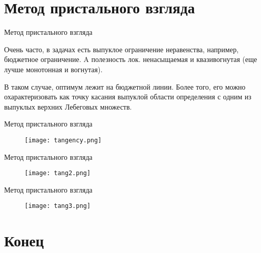 \documentclass{beamer}
\begin{document}
\section{Метод пристального взгляда}

\begin{frame}{Метод пристального взгляда}

Очень часто, в задачах есть выпуклое ограничение неравенства, например, бюджетное ограничение. A полезность лок. ненасыщаемая и квазивогнутая (еще лучше монотонная и вогнутая).

В таком случае, оптимум лежит на бюджетной линии. Более того, его можно охарактеризовать как точку касания выпуклой области определения с одним из выпуклых верхних Лебеговых множеств.
\end{frame}

\begin{frame}{Метод пристального взгляда}

\begin{figure}[hbt]
\centering
\texttt{[image: tangency.png]}
\end{figure}

\end{frame}
\begin{frame}{Метод пристального взгляда}

\begin{figure}[hbt]
\centering
\texttt{[image: tang2.png]}
\end{figure}

\end{frame}
\begin{frame}{Метод пристального взгляда}

\begin{figure}[hbt]
\centering
\texttt{[image: tang3.png]}
\end{figure}

\end{frame}

\section{Конец}
\end{document}
